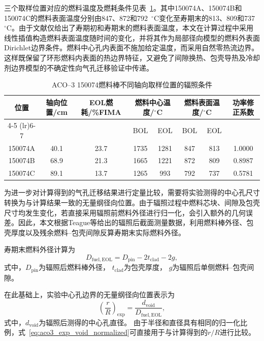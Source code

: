 三个取样位置对应的燃料温度及燃耗条件见表~\ref{tab:aco3_sample_conditions}。其中150074A、150074B和150074C的燃料表面温度分别由847、872和792~${}^{\circ}$C变化至寿期末的813、809和737~${}^{\circ}$C。由于文献仅给出了寿期初和寿期末的燃料表面温度，本文在计算过程中采用线性插值构造燃料表面温度随时间的变化，并将其作为局部径向模型的燃料外表面Dirichlet边界条件。燃料中心孔内表面不施加给定温度，而采用自然零热流边界。这样既保留了环形燃料内表面的热边界特征，又避免了间隙换热、包壳导热及冷却剂边界模型的不确定性向气孔迁移验证中传递。

\begin{table}[htbp]
	\centering
	\caption{ACO--3 150074燃料棒不同轴向取样位置的辐照条件}
	\label{tab:aco3_sample_conditions}
	\begin{tabular}{cccccccc}
		\toprule
		位置 &
		轴向位置/cm &
		EOL燃耗/\%FIMA &
		\multicolumn{2}{c}{燃料中心温度/${}^{\circ}$C} &
		\multicolumn{2}{c}{燃料表面温度/${}^{\circ}$C} &
		功率修正系数 \\
		\cmidrule(lr){4-5}
		\cmidrule(lr){6-7}
		& & & BOL & EOL & BOL & EOL & \\
		\midrule
		150074A & 40.1 & 23.7 & 1735 & 1281 & 847 & 813 & 1.0000 \\
		150074B & 68.9 & 21.3 & 1665 & 1221 & 872 & 809 & 0.8987 \\
		150074C & 89.1 & 13.7 & 1265 &  993 & 792 & 737 & 0.5781 \\
		\bottomrule
	\end{tabular}
\end{table}

为进一步对计算得到的气孔迁移结果进行定量比较，需要将实验测得的中心孔尺寸转换为与计算结果一致的无量纲径向位置。由于辐照过程中燃料芯块、间隙及包壳尺寸均发生变化，若直接采用辐照前燃料外径进行归一化，会引入额外的几何误差。因此，本文根据Teague等\cite{teagueMicrostructuralCharacterizationHigh2013}给出的辐照后截面测量数据，利用燃料棒外径、包壳厚度以及残余燃料--包壳间隙反算寿期末实际燃料外径。

寿期末燃料外径计算为
\begin{equation}
	D_{\mathrm{fuel,EOL}}
	=
	D_{\mathrm{pin}}
	-2t_{\mathrm{clad}}
	-2g ,
	\label{eq:aco3_eol_fuel_diameter}
\end{equation}
式中，$D_{\mathrm{pin}}$为辐照后燃料棒外径，
$t_{\mathrm{clad}}$为包壳厚度，
$g$为辐照后单侧燃料--包壳间隙。

在此基础上，实验中心孔边界的无量纲径向位置表示为
\begin{equation}
	\left(\frac{r}{R}\right)_{\mathrm{exp}}
	=
	\frac{d_{\mathrm{void}}}
	{D_{\mathrm{fuel,EOL}}},
	\label{eq:aco3_exp_void_normalized}
\end{equation}
式中，$d_{\mathrm{void}}$为辐照后测得的中心孔直径。
由于半径和直径具有相同的归一化比例，式~\eqref{eq:aco3_exp_void_normalized}可直接用于与计算得到的$r/R$进行比较。

